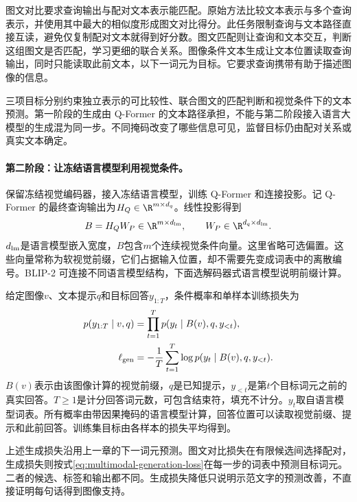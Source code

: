 图文对比要求查询输出与配对文本表示能匹配。原始方法比较文本表示与多个查询表示，并使用其中最大的相似度形成图文对比得分。此任务限制查询与文本路径直接互读，避免仅复制配对文本就得到好分数。图文匹配则让查询和文本交互，判断这组图文是否匹配，学习更细的联合关系。图像条件文本生成让文本位置读取查询输出，同时只能读取此前文本，以下一词元为目标。它要求查询携带有助于描述图像的信息。

三项目标分别约束独立表示的可比较性、联合图文的匹配判断和视觉条件下的文本预测。第一阶段的生成由 Q-Former 的文本路径承担，不能与第二阶段接入语言大模型的生成混为同一步。不同掩码改变了哪些信息可见，监督目标仍由配对关系或真实文本确定。

\paragraph{第二阶段：让冻结语言模型利用视觉条件。}
保留冻结视觉编码器，接入冻结语言模型，训练 Q-Former 和连接投影。记 Q-Former 的最终查询输出为$H_Q\in\R^{m\times d_q}$。线性投影得到
\begin{equation}
 B=H_QW_P\in\R^{m\times d_{\rm lm}},\qquad
 W_P\in\R^{d_q\times d_{\rm lm}}.
 \label{eq:multimodal-blip-prefix}
\end{equation}
$d_{\rm lm}$是语言模型嵌入宽度，$B$包含$m$个连续视觉条件向量。这里省略可选偏置。这些向量常称为软视觉前缀，它们占据输入位置，却不需要先变成词表中的离散编号。BLIP-2 可连接不同语言模型结构，下面选解码器式语言模型说明前缀计算。

给定图像$v$、文本提示$q$和目标回答$y_{1:T}$，条件概率和单样本训练损失为
\begin{align}
 p(y_{1:T}\mid v,q)
 &=\prod_{t=1}^T p(y_t\mid B(v),q,y_{<t}),\\
 \ell_{\rm gen}
 &=-\frac1T\sum_{t=1}^T
 \log p(y_t\mid B(v),q,y_{<t}).
 \label{eq:multimodal-generation-loss}
\end{align}
$B(v)$表示由该图像计算的视觉前缀，$q$是已知提示，$y_{<t}$是第$t$个目标词元之前的真实回答。$T\geq1$是计分回答词元数，可包含结束符，填充不计分。$y_t$取自语言模型词表。所有概率由带因果掩码的语言模型计算，回答位置可以读取视觉前缀、提示和此前回答。训练集目标由各样本的损失平均得到。

上述生成损失沿用上一章的下一词元预测。图文对比损失在有限候选间选择配对，生成损失则按式\eqref{eq:multimodal-generation-loss}在每一步的词表中预测目标词元。二者的候选、标签和输出都不同。生成损失降低只说明示范文字的预测改善，不直接证明每句话得到图像支持。

